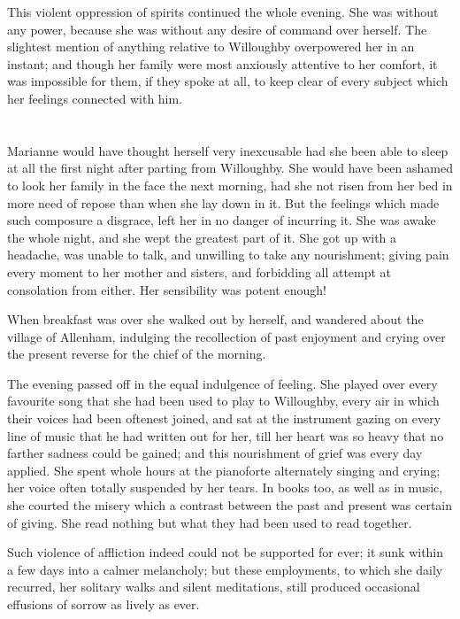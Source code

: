 This violent oppression of spirits continued the whole evening. She was without any power, because she was without any desire of command over herself. The slightest mention of anything relative to Willoughby overpowered her in an instant; and though her family were most anxiously attentive to her comfort, it was impossible for them, if they spoke at all, to keep clear of every subject which her feelings connected with him.

\chapter{} %

Marianne would have thought herself very inexcusable had she been able to sleep at all the first night after parting from Willoughby. She would have been ashamed to look her family in the face the next morning, had she not risen from her bed in more need of repose than when she lay down in it. But the feelings which made such composure a disgrace, left her in no danger of incurring it. She was awake the whole night, and she wept the greatest part of it. She got up with a headache, was unable to talk, and unwilling to take any nourishment; giving pain every moment to her mother and sisters, and forbidding all attempt at consolation from either. Her sensibility was potent enough!

When breakfast was over she walked out by herself, and wandered about the village of Allenham, indulging the recollection of past enjoyment and crying over the present reverse for the chief of the morning.

The evening passed off in the equal indulgence of feeling. She played over every favourite song that she had been used to play to Willoughby, every air in which their voices had been oftenest joined, and sat at the instrument gazing on every line of music that he had written out for her, till her heart was so heavy that no farther sadness could be gained; and this nourishment of grief was every day applied. She spent whole hours at the pianoforte alternately singing and crying; her voice often totally suspended by her tears. In books too, as well as in music, she courted the misery which a contrast between the past and present was certain of giving. She read nothing but what they had been used to read together.

Such violence of affliction indeed could not be supported for ever; it sunk within a few days into a calmer melancholy; but these employments, to which she daily recurred, her solitary walks and silent meditations, still produced occasional effusions of sorrow as lively as ever.

